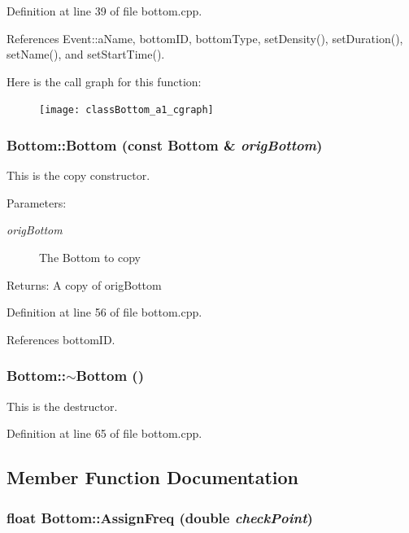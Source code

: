 Definition at line 39 of file bottom.cpp.

References Event::a\-Name, bottom\-ID, bottom\-Type, set\-Density(), set\-Duration(), set\-Name(), and set\-Start\-Time().

Here is the call graph for this function:\begin{figure}[H]
\begin{center}
\leavevmode
\texttt{[image: classBottom\_a1\_cgraph]}
\end{center}
\end{figure}
\subsubsection{\setlength{\rightskip}{0pt plus 5cm}Bottom::Bottom (const {\bf Bottom} \& {\em orig\-Bottom})}\label{classBottom_a2}


This is the copy constructor. \begin{Desc}
\item[Parameters:]
\begin{description}
\item[{\em orig\-Bottom}]The Bottom to copy \end{description}
\end{Desc}
\begin{Desc}
\item[Returns:]A copy of orig\-Bottom \end{Desc}


Definition at line 56 of file bottom.cpp.

References bottom\-ID.
\subsubsection{\setlength{\rightskip}{0pt plus 5cm}Bottom::$\sim${\bf Bottom} ()}\label{classBottom_a3}


This is the destructor. 

Definition at line 65 of file bottom.cpp.

\subsection{Member Function Documentation}
\subsubsection{\setlength{\rightskip}{0pt plus 5cm}float Bottom::Assign\-Freq (double {\em check\-Point})}\label{classBottom_a14}


